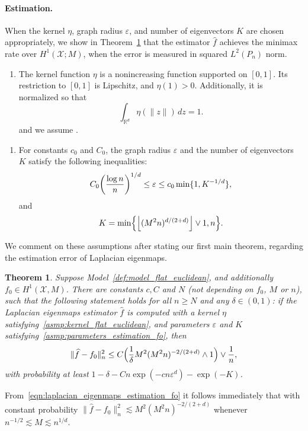 \documentclass{article}
\newcommand{\Reals}{\mathbb{R}}
\newcommand{\floor}[1]{\left\lfloor #1 \right\rfloor}
\newcommand{\1}{\mathbf{1}}
\newcommand{\Rd}{\Reals^d}
\newcommand{\mc}[1]{\mathcal{#1}}
\newcommand{\wh}[1]{\widehat{#1}}
\theoremstyle{alden}
\theoremstyle{aldenthm}
\newtheorem{theorem}{Theorem}
\theoremstyle{definition}
\theoremstyle{remark}
\begin{document}
\paragraph{Estimation.} When the kernel $\eta$, graph radius $\varepsilon$, and number of eigenvectors $K$ are chosen appropriately, we show in Theorem~\ref{thm:laplacian_eigenmaps_estimation_fo} that the estimator $\wh{f}$ achieves the minimax rate over $H^1(\mc{X};M)$, when the error is measured in squared $L^2(P_n)$ norm.
\begin{enumerate}[label=(K\arabic*)]
	\setcounter{enumi}{0}
	\item
	\label{asmp:kernel_flat_euclidean}
	The kernel function $\eta$ is a nonincreasing function supported on $[0,1]$. Its restriction to $[0,1]$ is Lipschitz, and $\eta(1) > 0$. Additionally, it is normalized so that
	\begin{equation*}
	\int_{\Rd} \eta(\|z\|) \,dz = 1.
	\end{equation*}
	and we assume \smash{$\sigma_{\eta} := \frac{1}{d}\int_{\Rd} \|x\|^2 \eta(\|x\|) \,dx < \infty$}.
\end{enumerate}
\begin{enumerate}[label=(P\arabic*)]
	\setcounter{enumi}{0}
	\item 
	\label{asmp:parameters_estimation_fo} 
	For constants $c_0$ and $C_0$, the graph radius $\varepsilon$ and the number of eigenvectors $K$ satisfy the following inequalities:
	\begin{equation}\\
	\label{eqn:radius_fo} 
	C_0\biggl(\frac{\log n}{n}\biggr)^{1/d} \leq \varepsilon \leq c_0\min\{1,K^{-1/d}\},
	\end{equation}
	and 
	\begin{equation}
	\label{eqn:eigenvector_estimation_fo} 
	K = \min\Bigl\{\floor{(M^2n)^{d/(2 + d)}} \vee 1, n\Bigr\}.
	\end{equation}
\end{enumerate}
We comment on these assumptions after stating our first main theorem, regarding the estimation error of Laplacian eigenmaps.
\begin{theorem}
	\label{thm:laplacian_eigenmaps_estimation_fo}
	Suppose Model~\ref{def:model_flat_euclidean}, and additionally $f_0 \in H^1(\mc{X},M)$. There are constants $c,C$ and $N$ (not depending on $f_0$, $M$ or $n$), such that the following statement holds for all $n \geq N$ and any $\delta \in (0,1)$: if the Laplacian eigenmaps estimator $\wh{f}$ is computed with a kernel $\eta$ satisfying~\ref{asmp:kernel_flat_euclidean}, and parameters $\varepsilon$ and $K$ satisfying~\ref{asmp:parameters_estimation_fo}, then
	\begin{equation}
	\label{eqn:laplacian_eigenmaps_estimation_fo}
	\|\wh{f} - f_0\|_n^2 \leq C\Bigl(\frac{1}{\delta}M^2(M^2n)^{-2/(2 + d)} \wedge 1\Bigr) \vee \frac{1}{n},
	\end{equation}
	with probability at least $1 - \delta - Cn\exp(-cn\varepsilon^d) - \exp(-K)$.
\end{theorem}
From~\eqref{eqn:laplacian_eigenmaps_estimation_fo} it follows immediately that with constant probability $\|\wh{f} - f_0\|_n^2 \lesssim M^2(M^2n)^{-2/(2 + d)}$ whenever $n^{-1/2} \lesssim M \lesssim n^{1/d}$. 
\end{document}
